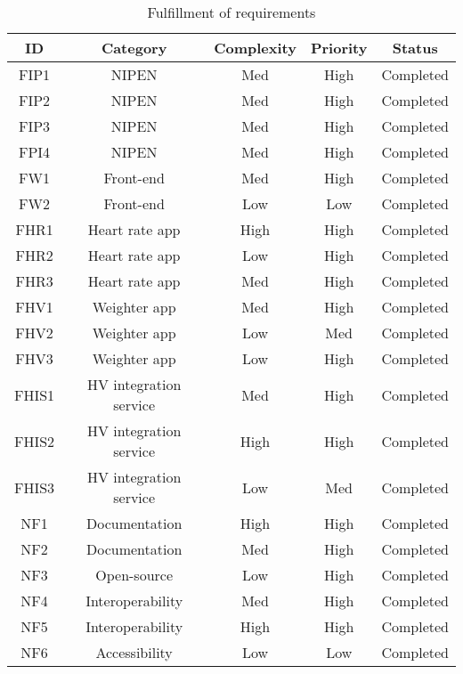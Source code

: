 \begin{table}[h]
\begin{center}
\begin{tabular}{ | c | c | c | c | c | }
  \hline
  \textbf{ID} & \textbf{Category} &\textbf{Complexity} & \textbf{Priority} & \textbf{Status}\\
  \hline\noalign{\smallskip}\noalign{\smallskip}\hline
  FIP1	& NIPEN				& Med	& High & Completed \\
  FIP2	& NIPEN				& Med	& High & Completed \\
  FIP3	& NIPEN				& Med	& High & Completed \\
  FPI4	& NIPEN				& Med	& High & Completed \\
  FW1   & Front-end			& Med	& High & Completed \\
  FW2   & Front-end			& Low	& Low  & Completed \\
  FHR1	& Heart rate app	& High	& High & Completed \\
  FHR2	& Heart rate app	& Low	& High & Completed \\
  FHR3	& Heart rate app	& Med	& High & Completed \\
  FHV1	& Weighter app		& Med	& High & Completed \\
  FHV2	& Weighter app		& Low	& Med  & Completed \\
  FHV3	& Weighter app		& Low	& High & Completed \\

  FHIS1	& HV integration service	& Med   & High & Completed \\
  FHIS2	& HV integration service	& High  & High & Completed \\
  FHIS3	& HV integration service	& Low	& Med  & Completed \\

  NF1 & Documentation		& High 	& High	& Completed \\
  NF2 & Documentation		& Med 	& High	& Completed \\
  NF3 & Open-source			& Low 	& High	& Completed \\
  NF4 & Interoperability	& Med	& High	& Completed \\
  NF5 & Interoperability	& High	& High	& Completed \\
  NF6 & Accessibility		& Low	& Low	& Completed \\

  \hline
\end{tabular}
\end{center}
\caption{Fulfillment of requirements}
\label{table:fulfill-req}
\end{table}


